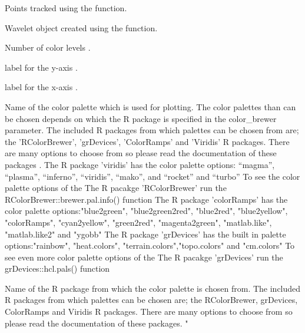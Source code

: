 \documentclass[a4paper]{book}
\begin{document}
%
\begin{Arguments}
\begin{ldescription}
\item[\code{tracking\_pts}] Points tracked using the  function.

\item[\code{wavelet}] Wavelet object created using the  function.

\item[\code{n.levels}] Number of color levels .

\item[\code{periodlab}] label for the y-axis .

\item[\code{x\_lab}] label for the x-axis .

\item[\code{palette\_name}] Name of the color palette which is used for plotting.
The color palettes than can be chosen depends on which the R package is specified in
the color\_brewer parameter. The included R packages from which palettes can be chosen
from are; the 'RColorBrewer', 'grDevices', 'ColorRamps' and 'Viridis' R packages.
There are many options to choose from so please
read the documentation of these packages .
The R package 'viridis' has the color palette options: “magma”, “plasma”,
“inferno”, “viridis”, “mako”, and “rocket”  and “turbo”
To see the color palette options of the The R pacakge 'RColorBrewer' run
the RColorBrewer::brewer.pal.info() function
The R package 'colorRamps' has the color palette options:"blue2green",
"blue2green2red", "blue2red",    "blue2yellow", "colorRamps",    "cyan2yellow",
"green2red", "magenta2green", "matlab.like", "matlab.like2" and    "ygobb"
The R package 'grDevices' has the built in  palette options:"rainbow",
"heat.colors", "terrain.colors","topo.colors" and "cm.colors"
To see even more color palette options of the The R pacakge 'grDevices' run
the grDevices::hcl.pals() function

\item[\code{color\_brewer}] Name of the R package from which the color palette is chosen from.
The included R packages from which palettes can be chosen
are; the RColorBrewer, grDevices, ColorRamps and Viridis R packages.
There are many options to choose from so please
read the documentation of these packages. "
\end{ldescription}
\end{Arguments}
\end{document}
